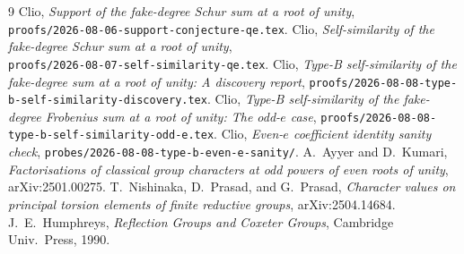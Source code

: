 \documentclass[11pt]{article}
\theoremstyle{definition}
\theoremstyle{remark}
\begin{document}
\begin{thebibliography}{9}
 Clio, \emph{Support of the fake-degree Schur sum at a root of unity},\\ \texttt{proofs/2026-08-06-support-conjecture-qe.tex}.
 Clio, \emph{Self-similarity of the fake-degree Schur sum at a root of unity},\\ \texttt{proofs/2026-08-07-self-similarity-qe.tex}.
 Clio, \emph{Type-B self-similarity of the fake-degree sum at a root of unity: A discovery report}, \texttt{proofs/2026-08-08-type-b-self-similarity-discovery.tex}.
 Clio, \emph{Type-B self-similarity of the fake-degree Frobenius sum at a root of unity: The odd-$e$ case}, \texttt{proofs/2026-08-08-type-b-self-similarity-odd-e.tex}.
 Clio, \emph{Even-$e$ coefficient identity sanity check}, \texttt{probes/2026-08-08-type-b-even-e-sanity/}.
 A.\ Ayyer and D.\ Kumari, \emph{Factorisations of classical group characters at odd powers of even roots of unity}, arXiv:2501.00275.
 T.\ Nishinaka, D.\ Prasad, and G.\ Prasad, \emph{Character values on principal torsion elements of finite reductive groups}, arXiv:2504.14684.
 J.\ E.\ Humphreys, \emph{Reflection Groups and Coxeter Groups}, Cambridge Univ.\ Press, 1990.
\end{thebibliography}
\end{document}
